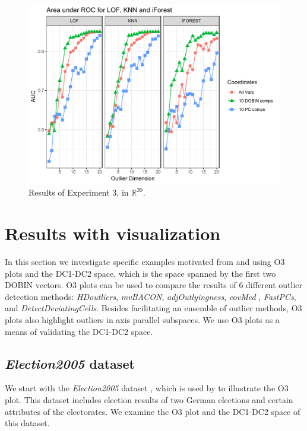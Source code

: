 \documentclass[a4paper,11pt]{article}
\begin{document}
\begin{figure}[!ht]
	\centering
	\includegraphics[scale=0.5]{Exp3.pdf}
	\caption{Results of Experiment 3, in $\mathbb{R}^{20}$.}
	\label{fig:Exp3}
\end{figure} 

\section{Results with visualization}\label{sec:ResWithVis}
In this section we investigate specific examples motivated from \cite{unwin2019multivariate} and \cite{wilkinson2017visualizing} using  O3 plots and the DC1-DC2 space, which is the space spanned by the first two DOBIN vectors. O3 plots \citep{unwin2019multivariate} can be used to compare the results of $6$ different outlier detection methods: \textit{HDoutliers},  \textit{mvBACON},  \textit{adjOutlyingness},  \textit{covMcd} , \textit{FastPCs},  and \textit{DetectDeviatingCells}. Besides facilitating an ensemble of outlier methods, O3 plots also highlight outliers in axis parallel subspaces. We use O3 plots as a means of validating the DC1-DC2 space. 

\subsection{\textit{Election2005} dataset}\label{sec:ResWithVis1}
We start with the \textit{Election2005} dataset \citep{mbgraphic}, which is used by \cite{unwin2019multivariate}  to illustrate the O3 plot. This dataset includes election results of two German elections and certain attributes of the electorates. We examine the O3 plot and the DC1-DC2 space of this dataset.  \\
\end{document}
